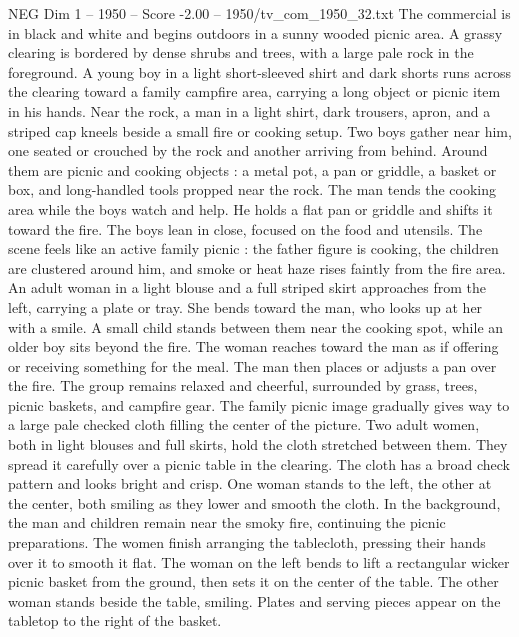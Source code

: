 \begin{textsample}{NEG Dim 1 – 1950 – Score -2.00 – 1950/tv\_com\_1950\_32.txt}  \label{ex:f1_neg_017}
The commercial is in black and white and begins outdoors in a sunny wooded picnic area.
A grassy clearing is bordered by dense shrubs and trees, with a large pale rock in the foreground.
A young boy in a light short-sleeved shirt and dark shorts runs across the clearing toward a family campfire area, carrying a long object or picnic item in his hands.
Near the rock, a man in a light shirt, dark trousers, apron, and a striped cap kneels beside a small fire or cooking setup.
Two boys gather near him, one seated or crouched by the rock and another arriving from behind.
Around them are picnic and cooking objects : a metal pot, a pan or griddle, a basket or box, and long-handled tools propped near the rock.
The man tends the cooking area while the boys watch and help.
He holds a flat pan or griddle and shifts it toward the fire.
The boys lean in close, focused on the food and utensils.
The scene feels like an active family picnic : the father figure is cooking, the children are clustered around him, and smoke or heat haze rises faintly from the fire area.
An adult woman in a light blouse and a full striped skirt approaches from the left, carrying a plate or tray.
She bends toward the man, who looks up at her with a smile.
A small child stands between them near the cooking spot, while an older boy sits beyond the fire.
The woman reaches toward the man as if offering or receiving something for the meal.
The man then places or adjusts a pan over the fire.
The group remains relaxed and cheerful, surrounded by grass, trees, picnic baskets, and campfire gear.
The family picnic image gradually gives way to a large pale checked cloth filling the center of the picture.
Two adult women, both in light blouses and full skirts, hold the cloth stretched between them.
They spread it carefully over a picnic table in the clearing.
The cloth has a broad check pattern and looks bright and crisp.
One woman stands to the left, the other at the center, both smiling as they lower and smooth the cloth.
In the background, the man and children remain near the smoky fire, continuing the picnic preparations.
The women finish arranging the tablecloth, pressing their hands over it to smooth it flat.
The woman on the left bends to lift a rectangular wicker picnic basket from the ground, then sets it on the center of the table.
The other woman stands beside the table, smiling.
Plates and serving pieces appear on the tabletop to the right of the basket.

\end{textsample}
